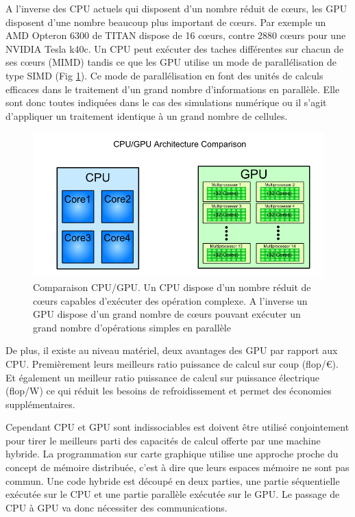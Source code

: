 A l'inverse des \ac{CPU} actuels qui disposent d'un nombre réduit de cœurs, les \ac{GPU} disposent d'une nombre beaucoup plus important de cœurs.
Par exemple un AMD Opteron 6300 de TITAN dispose de 16 cœurs, contre 2880 cœurs pour une NVIDIA Tesla k40c.
Un  \ac{CPU} peut exécuter des taches différentes sur chacun de ses cœurs (MIMD) tandis ce que les \ac{GPU} utilise un mode de parallélisation de type SIMD (Fig \ref{fig:cpugpu}).
Ce mode de parallélisation en font des unités de calculs efficaces dans le traitement d'un grand nombre d'informations en parallèle.
Elle sont donc toutes indiquées dans le cas des simulations numérique ou il s'agit d'appliquer un traitement identique à un grand nombre de cellules.

\begin{figure}
        \includegraphics[width=.95\linewidth]{img/02/cpu_vs_gpu.png} 
        \caption[Comparaison CPU/GPU]{Comparaison CPU/GPU. Un \ac{CPU} dispose d'un nombre réduit de cœurs capables d’exécuter des opération complexe. 
        A l'inverse un \ac{GPU} dispose d'un grand nombre de cœurs pouvant exécuter un grand nombre d'opérations simples en parallèle}
 		\label{fig:cpugpu}
\end{figure} 

De plus, il existe au niveau matériel, deux avantages des \ac{GPU} par rapport aux \ac{CPU}.
Premièrement leurs meilleurs ratio puissance de calcul sur coup (flop/€).
Et également un meilleur ratio puissance de calcul sur puissance électrique (flop/W) ce qui réduit les besoins de refroidissement et permet des économies supplémentaires.

Cependant \ac{CPU} et \ac{GPU} sont indissociables est doivent être utilisé conjointement pour tirer le meilleurs parti des capacités de calcul offerte par une machine hybride.
La programmation sur carte graphique utilise une approche proche du concept de mémoire distribuée, c'est à dire que leurs espaces mémoire ne sont pas commun.
Une code hybride est découpé en deux parties, une partie séquentielle exécutée sur le \ac{CPU} et une partie parallèle exécutée sur le \ac{GPU}.
Le passage de \ac{CPU} à \ac{GPU} va donc nécessiter des communications.

